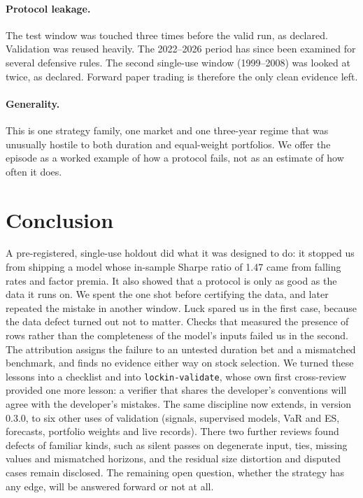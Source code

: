 \documentclass[11pt]{article}
\begin{document}
\paragraph{Protocol leakage.} The test window was touched three times before the valid run, as declared. Validation was reused heavily. The 2022--2026 period has since been examined for several defensive rules. The second single-use window (1999--2008) was looked at twice, as declared. Forward paper trading is therefore the only clean evidence left.

\paragraph{Generality.} This is one strategy family, one market and one three-year regime that was unusually hostile to both duration and equal-weight portfolios. We offer the episode as a worked example of how a protocol fails, not as an estimate of how often it does.

\section{Conclusion}\label{sec:conclusion}

A pre-registered, single-use holdout did what it was designed to do: it stopped us from shipping a model whose in-sample Sharpe ratio of 1.47 came from falling rates and factor premia. It also showed that a protocol is only as good as the data it runs on. We spent the one shot before certifying the data, and later repeated the mistake in another window. Luck spared us in the first case, because the data defect turned out not to matter. Checks that measured the presence of rows rather than the completeness of the model's inputs failed us in the second. The attribution assigns the failure to an untested duration bet and a mismatched benchmark, and finds no evidence either way on stock selection. We turned these lessons into a checklist and into \texttt{lockin-validate}, whose own first cross-review provided one more lesson: a verifier that shares the developer's conventions will agree with the developer's mistakes. The same discipline now extends, in version 0.3.0, to six other uses of validation (signals, supervised models, VaR and ES, forecasts, portfolio weights and live records). There two further reviews found defects of familiar kinds, such as silent passes on degenerate input, ties, missing values and mismatched horizons, and the residual size distortion and disputed cases remain disclosed. The remaining open question, whether the strategy has any edge, will be answered forward or not at all.
\end{document}
